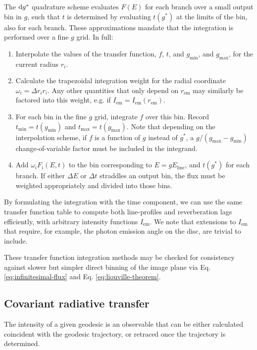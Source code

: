 The $\text{d} g^\ast$ quadrature scheme evaluates $F(E)$ for each branch over a small output bin in $g$, such that $t$ is determined by evaluating $t(g^\ast)$ at the limits of the bin, also for each branch. These approximations mandate that the integration is performed over a fine $g$ grid. In full:
\begin{enumerate}
    \item Interpolate the values of the transfer function, $f$, $t$, and $g_\text{min}$, and $g_\text{max}$, for the current radius $r_i$.
    \item Calculate the trapezoidal integration weight for the radial coordinate $\omega_i = \Delta r_i r_i$. Any other quantities that only depend on $r_\text{em}$ may similarly be factored into this weight, e.g. if $I_\text{em} = I_\text{em}(r_\text{em})$.
    \item For each bin in the fine $g$ grid, integrate $f$ over this bin. Record $t_\text{min} = t(g_\text{min})$ and $t_\text{max} = t(g_\text{max})$. Note that depending on the interpolation scheme, if $f$ is a function of $g$ instead of $g^\ast$, a $g / (g_\text{max} - g_\text{min})$ change-of-variable factor must be included in the integrand.
    \item Add $\omega_i F_i(E, t)$ to the bin corresponding to $E = gE_\text{line}$, and $t(g^\ast)$ for each branch. If either $\Delta E$ or $\Delta t$ straddles an output bin, the flux must be weighted appropriately and divided into those bins.
\end{enumerate}

By formulating the integration with the time component, we can use the same transfer function table to compute both line-profiles and reverberation lags efficiently, with arbitrary intensity functions $I_\text{em}$. We note that extensions to $I_\text{em}$ that require, for example, the photon emission angle on the disc, are trivial to include.

These transfer function integration methods may be checked for consistency against slower but simpler direct binning of the image plane via Eq. \eqref{eq:infinitesimal-flux} and Eq. \eqref{eq:liouville-theorem}.

\subsection{Covariant radiative transfer}

The intensity of a given geodesic is an observable that can be either calculated coincident with the geodesic trajectory, or retraced once the trajectory is determined.

